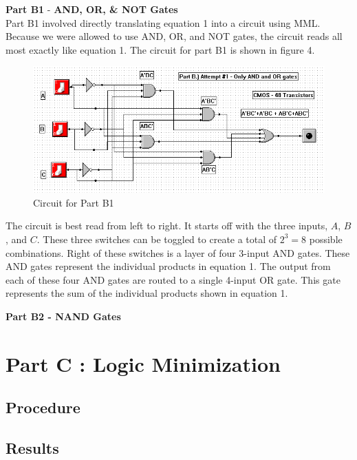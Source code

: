 \documentclass[a4paper,11pt]{article}
\begin{document}
\textbf{Part B1 }-\textbf{ AND, OR, \& NOT Gates} \\
Part B1 involved directly translating equation 1 into a circuit using MML. Because we were allowed to use AND, OR, and NOT gates, the circuit reads all most exactly like equation 1. The circuit for part B1 is shown in figure 4.
\begin{figure}[h!]
   \centering
     \includegraphics[width=6in]{PartB1Circuit}
   \caption{Circuit for Part B1}
   \label{fig:b1circuit}
\end{figure} 
The circuit is best read from left to right. It starts off with the three inputs, $A$, $B$, and $C$. These three switches can be toggled to create a total of $2^3 = 8$ possible combinations. Right of these switches is a layer of four 3-input AND gates. These AND gates represent the individual products in equation 1. The output from each of these four AND gates are routed to a single 4-input OR gate. This gate represents the sum of the individual products shown in equation 1.
\par

\textbf{Part B2 - NAND Gates}

\par



\section{Part C : Logic Minimization}
\subsection{Procedure}
\subsection{Results}
\end{document}

